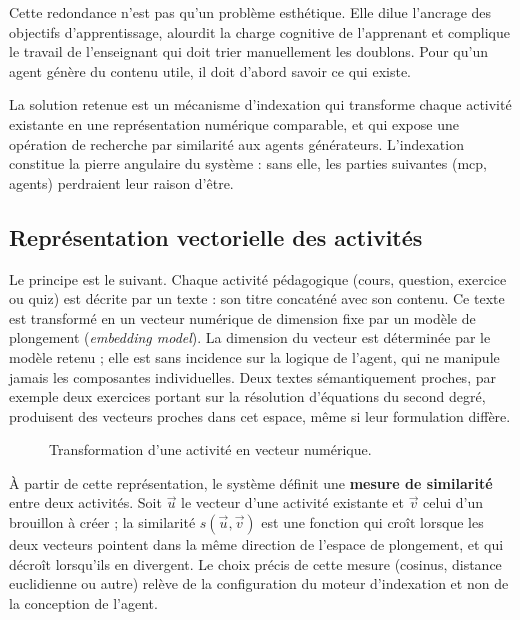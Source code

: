 Cette redondance n'est pas qu'un problème esthétique. Elle dilue l'ancrage des
objectifs d'apprentissage, alourdit la charge cognitive de l'apprenant et
complique le travail de l'enseignant qui doit trier manuellement les doublons.
Pour qu'un agent génère du contenu utile, il doit d'abord savoir ce qui existe.

La solution retenue est un mécanisme d'indexation qui transforme chaque
activité existante en une représentation numérique comparable, et qui expose
une opération de recherche par similarité aux agents générateurs.
L'indexation constitue la pierre angulaire du système : sans elle, les parties
suivantes (\gls{mcp}, agents) perdraient leur raison d'être.

\subsection{Représentation vectorielle des activités}

Le principe est le suivant. Chaque activité pédagogique (cours, question,
exercice ou quiz) est décrite par un texte : son titre concaténé avec son
contenu. Ce texte est transformé en un vecteur numérique de dimension fixe
par un modèle de plongement (\emph{embedding model}). La dimension du vecteur
est déterminée par le modèle retenu ; elle est sans incidence sur la logique
de l'agent, qui ne manipule jamais les composantes individuelles. Deux textes
sémantiquement proches, par exemple deux exercices portant sur la résolution
d'équations du second degré, produisent des vecteurs proches dans cet espace,
même si leur formulation diffère.

\begin{figure}[H]
\centering
{}
\caption{Transformation d'une activité en vecteur numérique.}
\label{fig:embedding}
\end{figure}

À partir de cette représentation, le système définit une \textbf{mesure de
similarité} entre deux activités. Soit $\vec{u}$ le vecteur d'une activité
existante et $\vec{v}$ celui d'un brouillon à créer ; la similarité
$s(\vec{u}, \vec{v})$ est une fonction qui croît lorsque les deux vecteurs
pointent dans la même direction de l'espace de plongement, et qui décroît
lorsqu'ils en divergent. Le choix précis de cette mesure (cosinus, distance
euclidienne ou autre) relève de la configuration du moteur d'indexation et
non de la conception de l'agent.

